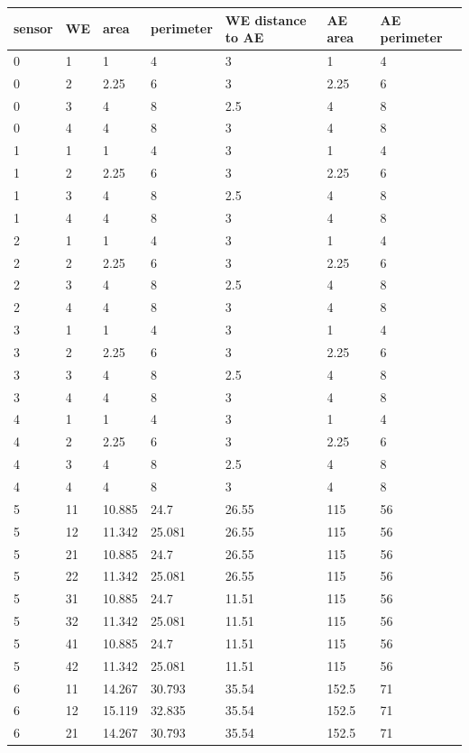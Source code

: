 \begin{table}
	\begin{tabular}{lllllll}
		sensor & WE & area & perimeter & WE distance to AE & AE area & AE perimeter \\
		\hline
		0 & 1 & 1 & 4 & 3 & 1 & 4 \\
		0 & 2 & 2.25 & 6 & 3 & 2.25 & 6 \\
		0 & 3 & 4 & 8 & 2.5 & 4 & 8 \\
		0 & 4 & 4 & 8 & 3 & 4 & 8 \\
		1 & 1 & 1 & 4 & 3 & 1 & 4 \\
		1 & 2 & 2.25 & 6 & 3 & 2.25 & 6 \\
		1 & 3 & 4 & 8 & 2.5 & 4 & 8 \\
		1 & 4 & 4 & 8 & 3 & 4 & 8 \\
		2 & 1 & 1 & 4 & 3 & 1 & 4 \\
		2 & 2 & 2.25 & 6 & 3 & 2.25 & 6 \\
		2 & 3 & 4 & 8 & 2.5 & 4 & 8 \\
		2 & 4 & 4 & 8 & 3 & 4 & 8 \\
		3 & 1 & 1 & 4 & 3 & 1 & 4 \\
		3 & 2 & 2.25 & 6 & 3 & 2.25 & 6 \\
		3 & 3 & 4 & 8 & 2.5 & 4 & 8 \\
		3 & 4 & 4 & 8 & 3 & 4 & 8 \\
		4 & 1 & 1 & 4 & 3 & 1 & 4 \\
		4 & 2 & 2.25 & 6 & 3 & 2.25 & 6 \\
		4 & 3 & 4 & 8 & 2.5 & 4 & 8 \\
		4 & 4 & 4 & 8 & 3 & 4 & 8 \\
		5 & 11 & 10.885 & 24.7 & 26.55 & 115 & 56 \\
		5 & 12 & 11.342 & 25.081 & 26.55 & 115 & 56 \\
		5 & 21 & 10.885 & 24.7 & 26.55 & 115 & 56 \\
		5 & 22 & 11.342 & 25.081 & 26.55 & 115 & 56 \\
		5 & 31 & 10.885 & 24.7 & 11.51 & 115 & 56 \\
		5 & 32 & 11.342 & 25.081 & 11.51 & 115 & 56 \\
		5 & 41 & 10.885 & 24.7 & 11.51 & 115 & 56 \\
		5 & 42 & 11.342 & 25.081 & 11.51 & 115 & 56 \\
		6 & 11 & 14.267 & 30.793 & 35.54 & 152.5 & 71 \\
		6 & 12 & 15.119 & 32.835 & 35.54 & 152.5 & 71 \\
		6 & 21 & 14.267 & 30.793 & 35.54 & 152.5 & 71 \\

\end{tabular}
\end{table}

